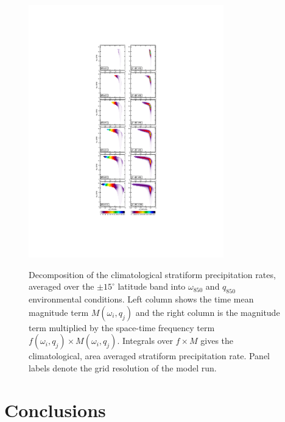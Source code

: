 \documentclass[times]{qjrms4}
\begin{document}
\begin{figure}
\begin{center}
\noindent\includegraphics[width=20pc,angle=0]{figs/temp_pdecomp.pdf}\\
\end{center}
\caption{Decomposition of the climatological stratiform precipitation rates, averaged over the $\pm 15^{\circ}$ latitude band into $\omega_{850}$ and $q_{850}$ environmental conditions. Left column shows the time mean magnitude term $M\left( \omega_i , q_j \right)$ and the right column is the magnitude term multiplied by the space-time frequency term $f\left( \omega_i , q_j \right) \times M\left( \omega_i , q_j \right)$. Integrals over $f \times M$ gives the climatological, area averaged stratiform precipitation rate. Panel labels denote the grid resolution of the model run.}
\label{fig:pdecomp}
\end{figure}

\section{Conclusions}
\end{document}
